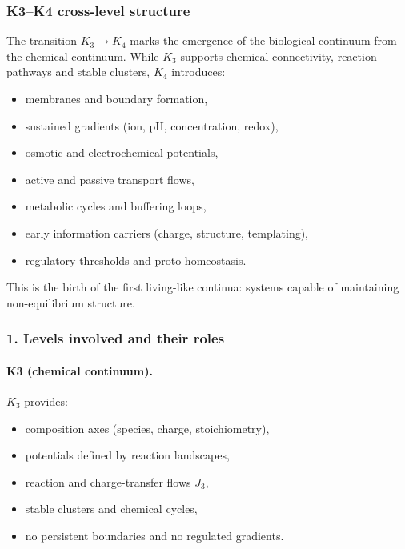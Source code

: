 
\subsubsection{K3–K4 cross-level structure}
\label{sec:crossk-k3-k4}

The transition $K_3 \rightarrow K_4$ marks the emergence of the biological
continuum from the chemical continuum. While $K_3$ supports chemical
connectivity, reaction pathways and stable clusters, $K_4$ introduces:
\begin{itemize}
  \item membranes and boundary formation,
  \item sustained gradients (ion, pH, concentration, redox),
  \item osmotic and electrochemical potentials,
  \item active and passive transport flows,
  \item metabolic cycles and buffering loops,
  \item early information carriers (charge, structure, templating),
  \item regulatory thresholds and proto-homeostasis.
\end{itemize}

This is the birth of the first living-like continua: systems capable of
maintaining non-equilibrium structure.

\subsubsection{1. Levels involved and their roles}

\paragraph{K3 (chemical continuum).}
$K_3$ provides:
\begin{itemize}
  \item composition axes (species, charge, stoichiometry),
  \item potentials defined by reaction landscapes,
  \item reaction and charge-transfer flows $J_3$,
  \item stable clusters and chemical cycles,
  \item no persistent boundaries and no regulated gradients.
\end{itemize}

